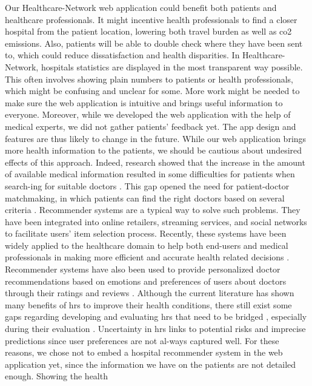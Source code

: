 Our Healthcare-Network web application could benefit both patients and
healthcare professionals. It might incentive health professionals to find a
closer hospital from the patient location, lowering both travel burden as well
as \ac{co2} emissions. Also, patients will be able to double check where they
have been sent to, which could reduce dissatisfaction and health disparities. In
Healthcare-Network, hospitals statistics are displayed in the most transparent
way possible. This often involves showing plain numbers to patients or health
professionals, which might be confusing and unclear for some. More work might be
needed to make sure the web application is intuitive and brings useful
information to everyone. Moreover, while we developed the web application with
the help of medical experts, we did not gather patients' feedback yet. The app
design and features are thus likely to change in the future. While our web
application brings more health information to the patients, we should be
cautious about undesired effects of this approach. Indeed, research showed that
the increase in the amount of available medical information resulted in some
difficulties for patients when search-ing for suitable doctors
\cite{narducci_recommender_2015,hoens_reliable_2010}. This gap opened the need
for patient-doctor matchmaking, in which patients can find the right doctors
based on several criteria \cite{han_hybrid_2018}. Recommender systems are a
typical way to solve such problems. They have been integrated into online
retailers, streaming services, and social networks to facilitate users' item
selection process. Recently, these systems have been widely applied to the
healthcare domain to help both end-users and medical professionals in making
more efficient and accurate health related decisions
\cite{tran_recommender_2021}. Recommender systems have also been used to provide
personalized doctor recommendations based on emotions and preferences of users
about doctors through their ratings and reviews \cite{zhang_idoctor_2017}.
Although the current literature has shown many benefits of \ac{hrs} to improve
their health conditions, there still exist some gaps regarding developing and
evaluating \ac{hrs} that need to be bridged \cite{tran_recommender_2021},
especially during their evaluation \cite{calero_valdez_recommender_2016}.
Uncertainty in \ac{hrs} links to potential risks and imprecise predictions since
user preferences are not al-ways captured well. For these reasons, we chose not
to embed a hospital recommender system in the web application yet, since the
information we have on the patients are not detailed enough. Showing the health
